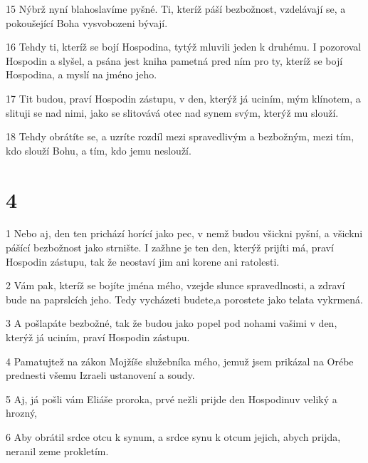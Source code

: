 \par 15 Nýbrž nyní blahoslavíme pyšné. Ti, kteríž páší bezbožnost, vzdelávají se, a pokoušející Boha vysvobozeni bývají.
\par 16 Tehdy ti, kteríž se bojí Hospodina, tytýž mluvili jeden k druhému. I pozoroval Hospodin a slyšel, a psána jest kniha pametná pred ním pro ty, kteríž se bojí Hospodina, a myslí na jméno jeho.
\par 17 Tit budou, praví Hospodin zástupu, v den, kterýž já uciním, mým klínotem, a slituji se nad nimi, jako se slitovává otec nad synem svým, kterýž mu slouží.
\par 18 Tehdy obrátíte se, a uzríte rozdíl mezi spravedlivým a bezbožným, mezi tím, kdo slouží Bohu, a tím, kdo jemu neslouží.

\chapter{4}

\par 1 Nebo aj, den ten prichází horící jako pec, v nemž budou všickni pyšní, a všickni pášící bezbožnost jako strnište. I zažhne je ten den, kterýž prijíti má, praví Hospodin zástupu, tak že neostaví jim ani korene ani ratolesti.
\par 2 Vám pak, kteríž se bojíte jména mého, vzejde slunce spravedlnosti, a zdraví bude na paprslcích jeho. Tedy vycházeti budete,a porostete jako telata vykrmená.
\par 3 A pošlapáte bezbožné, tak že budou jako popel pod nohami vašimi v den, kterýž já uciním, praví Hospodin zástupu.
\par 4 Pamatujtež na zákon Mojžíše služebníka mého, jemuž jsem prikázal na Orébe prednesti všemu Izraeli ustanovení a soudy.
\par 5 Aj, já pošli vám Eliáše proroka, prvé nežli prijde den Hospodinuv veliký a hrozný,
\par 6 Aby obrátil srdce otcu k synum, a srdce synu k otcum jejich, abych prijda, neranil zeme prokletím.

